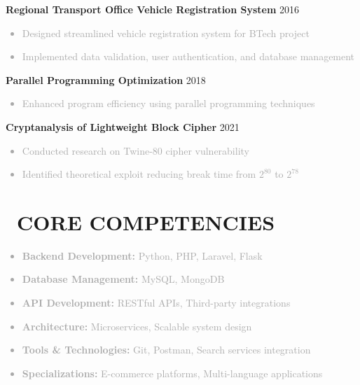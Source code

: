 \documentclass[10pt,a4paper]{article}
\begin{document}
\begin{paracol}{2}
\begin{rightcolumn}
\textbf{\color{darkblue}Regional Transport Office Vehicle Registration System} \hfill \textcolor{mediumgray}{2016}
\textcolor{darkgray}{
\begin{itemize}
    \item Designed streamlined vehicle registration system for BTech project
    \item Implemented data validation, user authentication, and database management
\end{itemize}
}

\textbf{\color{darkblue}Parallel Programming Optimization} \hfill \textcolor{mediumgray}{2018}
\textcolor{darkgray}{
\begin{itemize}
    \item Enhanced program efficiency using parallel programming techniques
\end{itemize}
}

\textbf{\color{darkblue}Cryptanalysis of Lightweight Block Cipher} \hfill \textcolor{mediumgray}{2021}
\textcolor{darkgray}{
\begin{itemize}
    \item Conducted research on Twine-80 cipher vulnerability
    \item Identified theoretical exploit reducing break time from $2^{80}$ to $2^{78}$
\end{itemize}
}

\vspace{3mm}
\section*{\faWrench\ CORE COMPETENCIES}
\textcolor{darkgray}{
\begin{itemize}
    \item \textbf{Backend Development:} Python, PHP, Laravel, Flask
    \item \textbf{Database Management:} MySQL, MongoDB
    \item \textbf{API Development:} RESTful APIs, Third-party integrations
    \item \textbf{Architecture:} Microservices, Scalable system design
    \item \textbf{Tools \& Technologies:} Git, Postman, Search services integration
    \item \textbf{Specializations:} E-commerce platforms, Multi-language applications
\end{itemize}
}

\end{rightcolumn}
\end{paracol}
\end{document}
